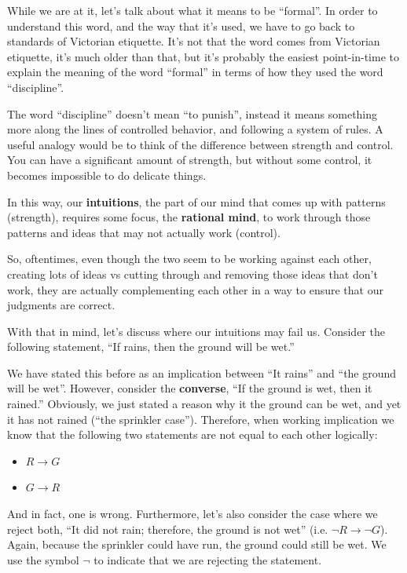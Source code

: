 While we are at it, let's talk about what it means to be ``formal''. In order to understand this word, and the way that it's used, we have to go back to standards of Victorian etiquette. It's not that the word comes from Victorian etiquette, it's much older than that, but it's probably the easiest point-in-time to explain the meaning of the word ``formal'' in terms of how they used the word ``discipline''.

The word ``discipline'' doesn't mean ``to punish'', instead it means something more along the lines of controlled behavior, and following a system of rules. A useful analogy would be to think of the difference between strength and control. You can have a significant amount of strength, but without some control, it becomes impossible to do delicate things.

In this way, our \textbf{intuitions}, the part of our mind that comes up with patterns (strength), requires some focus, the \textbf{rational mind}, to work through those patterns and ideas that may not actually work (control).

So, oftentimes, even though the two seem to be working against each other, creating lots of ideas vs cutting through and removing those ideas that don't work, they are actually complementing each other in a way to ensure that our judgments are correct.

With that in mind, let's discuss where our intuitions may fail us. Consider the following statement, ``If rains, then the ground will be wet.''

We have stated this before as an implication between ``It rains'' and ``the ground will be wet''. However, consider the \textbf{converse}, ``If the ground is wet, then it rained.'' Obviously, we just stated a reason why it the ground can be wet, and yet it has not rained (``the sprinkler case''). Therefore, when working implication we know that the following two statements are not equal to each other logically:




\begin{itemize}
    \item $ R \to G $
    \item $ G \to R $
\end{itemize}

And in fact, one is wrong. Furthermore, let's also consider the case where we reject both, ``It did not rain; therefore, the ground is not wet'' (i.e. $\neg R \to \neg G$). Again, because the sprinkler could have run, the ground could still be wet. We use the symbol $\neg$ to indicate that we are rejecting the statement.

